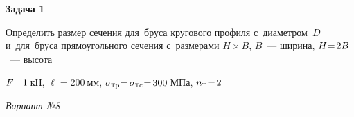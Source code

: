\documentclass[14pt]{extarticle}
\begin{document}
\begin{center}

\textbf{Задача 1\raisebox{.7ex}{\small я}}
\vspace{.4cm}

Определить размер сечения для~бруса кругового профиля с~диаметром~$D$
и~для~бруса прямоугольного сечения с~размерами ${H \!\times\! B}$\hbox{,\hspace{.2ex}} $B$~--- ширина\hbox{,\hspace{.2ex}} ${H \hspace{-.5ex}=\hspace{-.3ex} 2B}$~--- высота
\vspace{.6cm}


\vspace{.6cm}

${F \hspace{-.5ex}=\hspace{-.4ex} 1\:}$кН\hbox{,\hspace{.5ex}}
${\ell \!=\! 200\:}$мм\hbox{,\hspace{.5ex}}
${\sigma_{\mathrm{\scalebox{.6}{T}p}} \hspace{-.5ex}=\hspace{-.3ex} \sigma_{\mathrm{\scalebox{.6}{T}c}} \hspace{-.5ex}=\hspace{-.3ex} 300\:}$МПа\hbox{,\hspace{.5ex}}
${n_{\mathrm{\scalebox{.6}{T}}} \hspace{-.44ex}=\hspace{-.33ex} 2}$

\vspace{1.2cm}

\emph{Вариант №\hspace{.33ex}8}
\vspace{.8cm}


\end{center}
\end{document}
